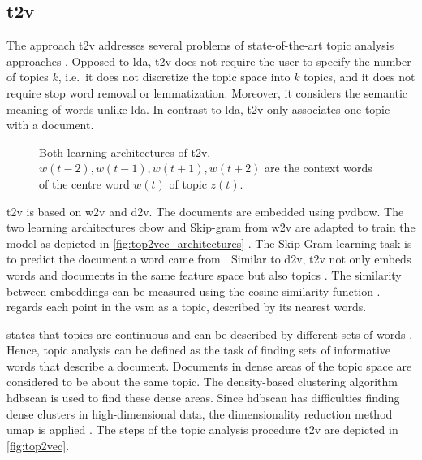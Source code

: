 \subsection{\acl*{t2v}}\label{subsec:top2vec}

The approach \ac{t2v} addresses several problems of state-of-the-art topic analysis approaches \cite{Top2Vec2020}.
Opposed to \ac{lda}, \ac{t2v} does not require the user to specify the number of topics $k$, 
i.e.\ it does not discretize the topic space into $k$ topics, 
and it does not require stop word removal or lemmatization.
Moreover, it considers the semantic meaning of words unlike \ac{lda}.
In contrast to \ac{lda}, \ac{t2v} only associates one topic with a document.

\begin{figure}%
    \centering
    \qquad
    \caption[Two learning architectures of \acs*{t2v}]{Both learning architectures of \acs*{t2v}.
    $w(t-2), w(t-1), w(t+1), w(t+2)$ are the context words of the centre word $w(t)$ of topic $z(t)$.
    }%
    \label{fig:top2vec_architectures}%
\end{figure}

\ac{t2v} is based on \ac{w2v} and \ac{d2v}.
The documents are embedded using \ac{pvdbow}.
The two learning architectures \ac{cbow} and Skip-gram from \ac{w2v} are adapted to train the model as depicted in \autoref{fig:top2vec_architectures} \cite{Topic2Vec2015}.
The Skip-Gram learning task is to predict the document a word came from \cite{Top2Vec2020, Topic2Vec2015}.
Similar to \ac{d2v}, \ac{t2v} not only embeds words and documents in the same feature space but also topics \cite{Top2Vec2020, Topic2Vec2015}.
The similarity between embeddings can be measured using the cosine similarity function \cite{Topic2Vec2015}.
\citeauthor{Top2Vec2020} regards each point in the \ac{vsm} as a topic, described by its nearest words.

\citeauthor{Top2Vec2020} states that topics are continuous and can be described by different sets of words \cite{Top2Vec2020}.
Hence, topic analysis can be defined as the task of finding sets of informative words that describe a document.
Documents in dense areas of the topic space are considered to be about the same topic.
The density-based clustering algorithm \ac{hdbscan} is used to find these dense areas.
Since \ac{hdbscan} has difficulties finding dense clusters in high-dimensional data, 
the dimensionality reduction method \ac{umap} is applied \cite{Top2Vec2020}.
The steps of the topic analysis procedure \ac{t2v} are depicted in \autoref{fig:top2vec}.

